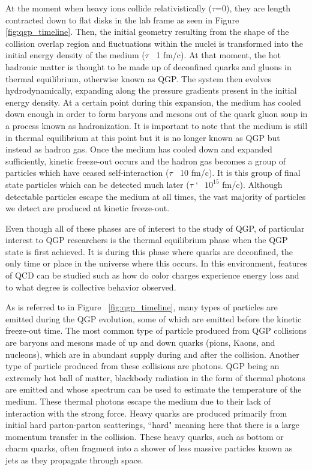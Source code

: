 At the moment when heavy ions collide relativistically ($\tau$=0), they are length contracted down to flat disks in the lab frame as seen in Figure \ref{fig:qgp_timeline}. Then, the initial geometry resulting from the shape of the collision overlap region and fluctuations within the nuclei is transformed into the initial energy density of the medium ($\tau$ $~$ 1 fm/c). At that moment, the hot hadronic matter is thought to be made up of deconfined quarks and gluons in thermal equilibrium, otherwise known as QGP. The system then evolves hydrodynamically, expanding along the pressure gradients present in the initial energy density. At a certain point during this expansion, the medium has cooled down enough in order to form baryons and mesons out of the quark gluon soup in a process known as hadronization. It is important to note that the medium is still in thermal equilibrium at this point but it is no longer known as QGP but instead as hadron gas. Once the medium has cooled down and expanded sufficiently, kinetic freeze-out occurs and the hadron gas becomes a group of particles which have ceased self-interaction ($\tau$ $~$ 10 fm/c). It is this group of final state particles which can be detected much later ($\tau$ $`~$ $10^{15}$ fm/c). Although detectable particles escape the medium at all times, the vast majority of particles we detect are produced at kinetic freeze-out. 

Even though all of these phases are of interest to the study of QGP, of particular interest to QGP researchers is the thermal equilibrium phase when the QGP state is first achieved. It is during this phase where quarks are deconfined, the only time or place in the universe where this occurs. In this environment, features of QCD can be studied such as how do color charges experience energy loss and to what degree is collective behavior observed. 

As is referred to in Figure ~\ref{fig:qgp_timeline}, many types of particles are emitted during the QGP evolution, some of which are emitted before the kinetic freeze-out time. The most common type of particle produced from QGP collisions are baryons and mesons made of up and down quarks (pions, Kaons, and nucleons), which are in abundant supply during and after the collision. Another type of particle produced from these collisions are photons. QGP being an extremely hot ball of matter, blackbody radiation in the form of thermal photons are emitted and whose spectrum can be used to estimate the temperature of the medium. These thermal photons escape the medium due to their lack of interaction with the strong force. Heavy quarks are produced primarily from initial hard parton-parton scatterings, ``hard" meaning here that there is a large momentum transfer in the collision. These heavy quarks, such as bottom or charm quarks, often fragment into a shower of less massive particles known as jets as they propagate through space.

